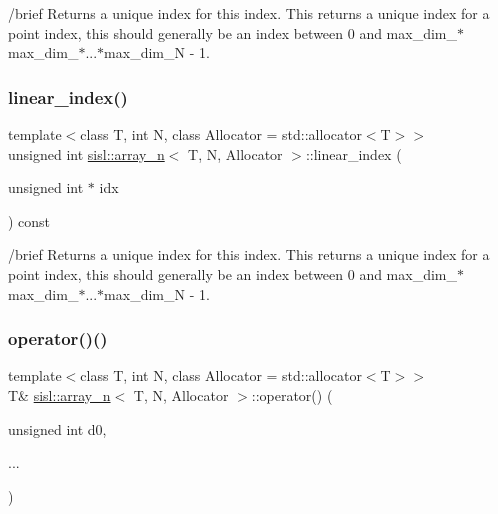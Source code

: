 /brief Returns a unique index for this index. This returns a unique index for a point index, this should generally be an index between 0 and max\+\_\+dim\+\_$\ast$max\+\_\+dim\+\_$\ast$...$\ast$max\+\_\+dim\+\_\+N -\/ 1. \mbox{\label{classsisl_1_1array__n_a04888819bc3567f52f52bdccdecd7e5c}} 
\subsubsection{\texorpdfstring{linear\+\_\+index()}{linear\_index()}\hspace{0.1cm}{\footnotesize\ttfamily [3/3]}}
{\footnotesize\ttfamily template$<$class T, int N, class Allocator = std\+::allocator$<$\+T$>$$>$ \\
unsigned int \hyperlink{classsisl_1_1array__n}{sisl\+::array\+\_\+n}$<$ T, N, Allocator $>$\+::linear\+\_\+index (\begin{DoxyParamCaption}\item[{unsigned int $\ast$}]{idx }\end{DoxyParamCaption}) const\hspace{0.3cm}{\ttfamily [inline]}}

/brief Returns a unique index for this index. This returns a unique index for a point index, this should generally be an index between 0 and max\+\_\+dim\+\_$\ast$max\+\_\+dim\+\_$\ast$...$\ast$max\+\_\+dim\+\_\+N -\/ 1. \mbox{\label{classsisl_1_1array__n_a1fa1d22e81493e308a6ad66a5100ca43}} 
\subsubsection{\texorpdfstring{operator()()}{operator()()}\hspace{0.1cm}{\footnotesize\ttfamily [1/4]}}
{\footnotesize\ttfamily template$<$class T, int N, class Allocator = std\+::allocator$<$\+T$>$$>$ \\
T\& \hyperlink{classsisl_1_1array__n}{sisl\+::array\+\_\+n}$<$ T, N, Allocator $>$\+::operator() (\begin{DoxyParamCaption}\item[{unsigned int}]{d0,  }\item[{}]{... }\end{DoxyParamCaption})\hspace{0.3cm}{\ttfamily [inline]}}

